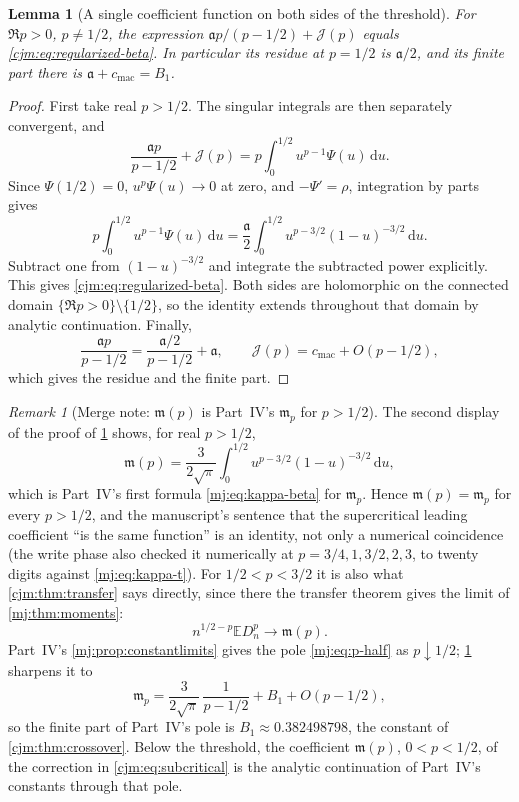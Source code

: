 \documentclass[11pt,a4paper]{article}
\newtheorem{lemma}[lemma]{Lemma}
\theoremstyle{definition}\newaliascnt{definition}{theorem}
\theoremstyle{remark}\newaliascnt{remark}{theorem}
\newtheorem{remark}[remark]{Remark}
\newcommand{\dd}{\mathrm d}
\newcommand{\ljE}{\mathbb E}
\newcommand{\cjmac}{c_{\mathrm{mac}}}
\begin{document}
\begin{lemma}[A single coefficient function on both sides of the threshold]
\label{cjm:lem:beta}
For $\Re p>0$, $p\ne1/2$, the expression
$\mathfrak ap/(p-1/2)+\mathcal J(p)$ equals \eqref{cjm:eq:regularized-beta}.
In particular its residue at $p=1/2$ is $\mathfrak a/2$, and its finite part
there is $\mathfrak a+\cjmac=B_1$.
\end{lemma}
\begin{proof}
First take real $p>1/2$. The singular integrals are then separately
convergent, and
\[
 \frac{\mathfrak ap}{p-1/2}+\mathcal J(p)=p\int_0^{1/2}u^{p-1}\Psi(u)\,\dd u.
\]
Since $\Psi(1/2)=0$, $u^p\Psi(u)\to0$ at zero, and
$-\Psi'=\rho$, integration by parts gives
\[
 p\int_0^{1/2}u^{p-1}\Psi(u)\,\dd u
 =\frac{\mathfrak a}2\int_0^{1/2}u^{p-3/2}(1-u)^{-3/2}\,\dd u.
\]
Subtract one from $(1-u)^{-3/2}$ and integrate the subtracted power
explicitly. This gives \eqref{cjm:eq:regularized-beta}.
Both sides are holomorphic on the connected domain
$\{\Re p>0\}\setminus\{1/2\}$, so the identity extends throughout that
domain by analytic continuation. Finally,
\[
 \frac{\mathfrak ap}{p-1/2}=\frac{\mathfrak a/2}{p-1/2}+\mathfrak a,
 \qquad \mathcal J(p)=\cjmac+O(p-1/2),
\]
which gives the residue and the finite part.
\end{proof}

\begin{remark}[Merge note: $\mathfrak m(p)$ is Part~IV's $\mathfrak m_p$ for $p>1/2$]
\label{cjm:rem:mp}
The second display of the proof of \cref{cjm:lem:beta} shows, for real
$p>1/2$,
\[
 \mathfrak m(p)=\frac3{2\sqrt\pi}\int_0^{1/2}u^{p-3/2}(1-u)^{-3/2}\,\dd u,
\]
which is Part~IV's first formula \eqref{mj:eq:kappa-beta} for
$\mathfrak m_p$. Hence $\mathfrak m(p)=\mathfrak m_p$ for every $p>1/2$, and
the manuscript's sentence that the supercritical leading coefficient ``is the
same function'' is an identity, not only a numerical coincidence (the
write phase also checked it numerically at $p=3/4,1,3/2,2,3$, to twenty
digits against \eqref{mj:eq:kappa-t}). For $1/2<p<3/2$ it is also what
\cref{cjm:thm:transfer} says directly, since there the transfer theorem
gives the limit of \cref{mj:thm:moments}:
\[
 n^{1/2-p}\ljE D_n^p\longrightarrow\mathfrak m(p).
\]
Part~IV's \cref{mj:prop:constantlimits} gives the pole
\eqref{mj:eq:p-half} as $p\downarrow1/2$; \cref{cjm:lem:beta} sharpens it
to
\[
 \mathfrak m_p=\frac{3}{2\sqrt\pi}\,\frac{1}{p-1/2}+B_1+O(p-1/2),
\]
so the finite part of Part~IV's pole is $B_1\approx0.382498798$, the
constant of \cref{cjm:thm:crossover}. Below the threshold, the coefficient
$\mathfrak m(p)$, $0<p<1/2$, of the correction in \eqref{cjm:eq:subcritical}
is the analytic continuation of Part~IV's constants through that pole.
\end{remark}
\end{document}
